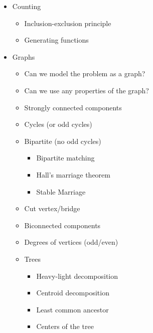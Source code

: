 \documentclass[9pt,a4paper,twocolumn,landscape,oneside]{amsart}
\newenvironment{myitemize}
{ \begin{itemize}[leftmargin=.5cm]
    \setlength{\itemsep}{0pt}
    \setlength{\parskip}{0pt}
    \setlength{\parsep}{0pt}     }
{ \end{itemize}                  }
\begin{document}
\begin{multicols*}{3}
\begin{myitemize}
\begin{itemize}
                        \item Store $2^k$ jump pointers
                        \item $2^k$ merging trick
                    \end{itemize}
                \item Counting
                    \begin{itemize}
                        \item Inclusion-exclusion principle
                        \item Generating functions
                    \end{itemize}
                \item Graphs
                    \begin{itemize}
                        \item Can we model the problem as a graph?
                        \item Can we use any properties of the graph?
                        \item Strongly connected components
                        \item Cycles (or odd cycles)
                        \item Bipartite (no odd cycles)
                            \begin{itemize}
                                \item Bipartite matching
                                \item Hall's marriage theorem
                                \item Stable Marriage
                            \end{itemize}
                        \item Cut vertex/bridge
                        \item Biconnected components
                        \item Degrees of vertices (odd/even)
                        \item Trees
                            \begin{itemize}
                                \item Heavy-light decomposition
                                \item Centroid decomposition
                                \item Least common ancestor
                                \item Centers of the tree

\end{itemize}
\end{itemize}
\end{myitemize}
\end{multicols*}
\end{document}
